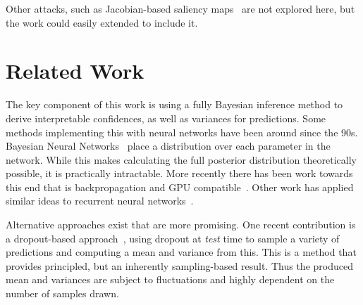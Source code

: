 \documentclass{article}
\begin{document}
Other attacks, such as Jacobian-based saliency maps~\cite{papernot2016limitations} are not explored here, but the work could easily extended to include it.


  
 



\section{Related Work}


The key component of this work is using a fully Bayesian inference method to derive interpretable confidences, as well as variances for predictions. Some methods implementing this with neural networks have been around since the 90s. Bayesian Neural Networks~\cite{mackay1992practical} place a distribution over each parameter in the network. While this makes calculating the full posterior distribution theoretically possible, it is practically intractable. More recently there has been work towards this end that is backpropagation and GPU compatible~\cite{blundell2015weight}. Other work has applied similar ideas to recurrent neural networks~\cite{zhu2017deep}.

Alternative approaches exist that are more promising. One recent contribution is a dropout-based approach~\cite{gal2016dropout}, using dropout at \textit{test} time to sample a variety of predictions and computing a mean and variance from this. This is a  method that provides principled, but an inherently sampling-based result. Thus the produced mean and variances are subject to fluctuations and highly dependent on the number of samples drawn.
\end{document}
